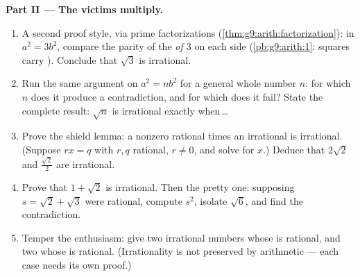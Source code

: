 \begin{problem}
\medskip
\noindent\textbf{Part II --- The victims multiply.}
\begin{enumerate}[resume]
  \item A second proof style, via prime factorizations
        (\cref{thm:g9:arith:factorization}): in $a^2 = 3b^2$,
        compare the parity of the \emph{ of $3$} on each
        side (\cref{pb:g9:arith:1}: squares carry 
        ). Conclude that $\sqrt3$ is irrational.
  \item Run the same  argument on $a^2 = n b^2$ for a
        general whole number $n$: for which $n$ does it produce
        a contradiction, and for which does it fail? State the
        complete result: $\sqrt n$ is irrational exactly
        when\,\dots
  \item Prove the shield lemma: a nonzero rational times an
        irrational is irrational. (Suppose $r x = q$ with $r, q$
        rational, $r \neq 0$, and solve for $x$.) Deduce that
        $2\sqrt2$ and $\frac{\sqrt2}{2}$ are irrational.
  \item Prove that $1 + \sqrt2$ is irrational. Then the pretty
        one: supposing $s = \sqrt2 + \sqrt3$ were rational,
        compute $s^2$, isolate $\sqrt6$, and find the
        contradiction.
  \item Temper the enthusiasm: give two irrational numbers whose
        \emph{} is rational, and two whose \emph{} is
        rational. (Irrationality is not preserved by arithmetic
        --- each case needs its own proof.)
\end{enumerate}


\end{problem}
